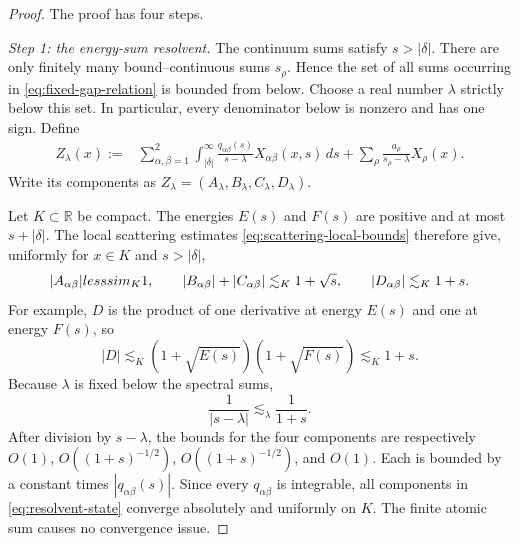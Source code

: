 \documentclass[11pt]{amsart}
\numberwithin{equation}{section}
\theoremstyle{remark}
\newcommand{\R}{\mathbb R}
\begin{document}
\begin{proof}
The proof has four steps.

\smallskip
\noindent
\emph{Step 1: the energy-sum resolvent.}
The continuum sums satisfy $s>|\delta|$.  There are only finitely many
bound--continuous sums $s_\rho$.  Hence the set of all sums occurring in
\eqref{eq:fixed-gap-relation} is bounded from below.  Choose a real number
$\lambda$ strictly below this set.  In particular, every denominator below is
nonzero and has one sign.  Define
\begin{align}
 Z_\lambda(x)
 :={}&\sum_{\alpha,\beta=1}^2
 \int_{|\delta|}^\infty
 \frac{q_{\alpha\beta}(s)}{s-\lambda}
 X_{\alpha\beta}(x,s)\,ds
 +\sum_\rho\frac{a_\rho}{s_\rho-\lambda}X_\rho(x).
 \label{eq:resolvent-state}
\end{align}
Write its components as
$Z_\lambda=(A_\lambda,B_\lambda,C_\lambda,D_\lambda)$.

Let $K\subset\R$ be compact.  The energies $E(s)$ and $F(s)$ are positive and
at most $s+|\delta|$.  The local scattering estimates
\eqref{eq:scattering-local-bounds} therefore give, uniformly for $x\in K$ and
$s>|\delta|$,
\begin{equation}
 |A_{\alpha\beta}|\\lesssim_K1,
 \qquad
 |B_{\alpha\beta}|+|C_{\alpha\beta}|
 \lesssim_K1+\sqrt{s},
 \qquad
 |D_{\alpha\beta}|\lesssim_K1+s.
 \label{eq:product-state-bounds}
\end{equation}
For example, $D$ is the product of one derivative at energy $E(s)$ and one at
energy $F(s)$, so
\[
 |D|\lesssim_K(1+\sqrt{E(s)})(1+\sqrt{F(s)})\lesssim_K1+s.
\]
Because $\lambda$ is fixed below the spectral sums,
\[
 \frac1{|s-\lambda|}\lesssim_\lambda\frac1{1+s}.
\]
After division by $s-\lambda$, the bounds for the four components are
respectively $O(1)$, $O((1+s)^{-1/2})$, $O((1+s)^{-1/2})$, and $O(1)$.
Each is bounded by a constant times $|q_{\alpha\beta}(s)|$.  Since every
$q_{\alpha\beta}$ is integrable, all components in
\eqref{eq:resolvent-state} converge absolutely and uniformly on $K$.  The
finite atomic sum causes no convergence issue.


\end{proof}
\end{document}
